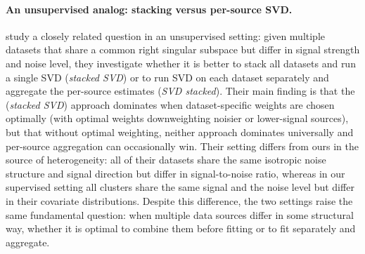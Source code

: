 \documentclass{article}
\theoremstyle{plain}
\theoremstyle{remark}
\begin{document}
\paragraph{An unsupervised analog: stacking versus per-source SVD.}
\citet{baharav2025stackedsvd} study a closely related question in an unsupervised setting: given multiple datasets that share a common right singular subspace but differ in signal strength and noise level, they investigate whether it is better to stack all datasets and run a single SVD (\emph{stacked SVD}) or to run SVD on each dataset separately and aggregate the per-source estimates (\emph{SVD stacked}). Their main finding is that the (\emph{stacked SVD}) approach dominates when dataset-specific weights are chosen optimally (with optimal weights downweighting noisier or lower-signal sources), but that without optimal weighting, neither approach dominates universally and per-source aggregation can occasionally win. Their setting differs from ours in the source of heterogeneity: all of their datasets share the same isotropic noise structure and signal direction but differ in signal-to-noise ratio, whereas in our supervised setting all clusters share the same signal and the noise level but differ in their covariate distributions. Despite this difference, the two settings raise the same fundamental question: when multiple data sources differ in some structural way,  whether it is optimal to combine them before fitting or to fit separately and aggregate. 
\end{document}
